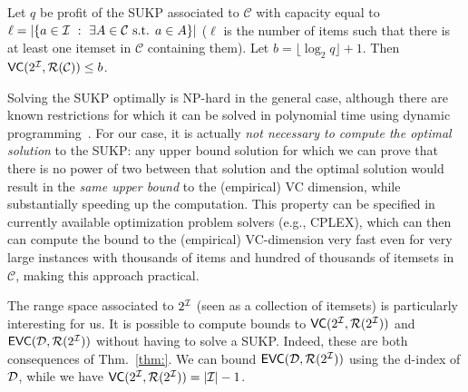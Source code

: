 \begin{corollary}\label{lem:sukpvc}
  Let $q$ be profit of the SUKP associated to $\mathcal{C}$ with capacity
  equal to $\ell=|\{a\in{\cal I} ~:~ \exists A\in\mathcal{C} \mbox{ s.t. } a\in
  A\}|$ ($\ell$ is the number of items such that there is at least one itemset in $\mathcal{C}$ containing
  them).
  Let $b=\lfloor\log_2 q\rfloor + 1$. Then
  $\mathsf{VC}(2^{\cal I},\mathcal{R}(\mathcal{C}))\le b$. %
\end{corollary}

Solving the SUKP optimally is NP-hard in the general case, although there are
known restrictions for which it can be solved in polynomial time using dynamic
programming~\citep{GoldschmidtNY94}. 
For our case, it is actually \emph{not necessary to compute the optimal
solution} to the SUKP: any upper bound solution for which we can prove that
there is no power of two between that solution and the optimal solution would
result in the \emph{same upper bound} to the (empirical) VC dimension, while
substantially speeding up the computation. This property can be specified in
currently available optimization problem solvers (e.g., CPLEX), which can then
can compute the bound to the (empirical) VC-dimension very fast even for very
large instances with thousands of items and hundred of thousands of itemsets in
$\mathcal{C}$, making this approach practical. %


The range space associated to $2^{\cal I}$ (seen as a collection of itemsets) is
particularly interesting for us. It is possible  %
to compute bounds to $\mathsf{VC}(2^{\cal I},\mathcal{R}(2^{\cal I}))$ and
$\mathsf{EVC}({\cal D},\mathcal{R}(2^{\cal I}))$ without having to solve a SUKP. Indeed, these are
both consequences of Thm.~\ref{thm:}. We can bound $\mathsf{EVC}({\cal D},\mathcal{R}(2^{\cal I}))$
using the d-index of ${\cal D}$, while we have $\mathsf{VC}(2^{\cal I},\mathcal{R}(2^{\cal I}))=|{\cal I}|-1$.

